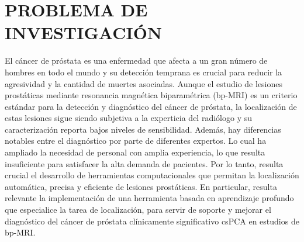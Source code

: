 

\chapter{PROBLEMA DE INVESTIGACIÓN}

El cáncer de próstata es una enfermedad que afecta a un gran número de hombres en todo el mundo y su detección temprana es crucial para reducir la agresividad y la cantidad de muertes asociadas. Aunque el estudio de lesiones prostáticas mediante resonancia magnética biparamétrica (bp-MRI) es un criterio estándar para la detección y diagnóstico del cáncer de próstata, la localización de estas lesiones sigue siendo subjetiva a la experticia del radiólogo y su caracterización reporta bajos niveles de sensibilidad. Además, hay diferencias notables entre el diagnóstico por parte de diferentes expertos. Lo cual ha ampliado la necesidad de personal con amplia experiencia, lo que resulta insuficiente para satisfacer la alta demanda de pacientes. Por lo tanto, resulta crucial el desarrollo de herramientas computacionales que permitan la localización automática, precisa y eficiente de lesiones prostáticas. En particular, resulta relevante la implementación de una herramienta basada en aprendizaje profundo que especialice la tarea de localización, para servir de soporte y mejorar el diagnóstico del cáncer de próstata clínicamente significativo csPCA en estudios de bp-MRI.



